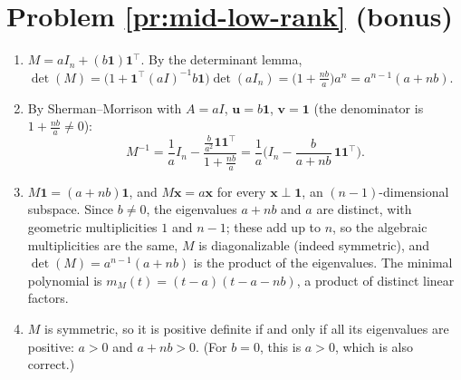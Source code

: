 \documentclass[11pt]{article}
\begin{document}
\section*{Problem \ref{pr:mid-low-rank} (bonus)}

\begin{enumerate}[label=(\alph*)]
    \item $M = aI_n + (b\mathbf{1})\mathbf{1}^\top$. By the determinant lemma, $\det(M) = \big(1 + \mathbf{1}^\top (aI)^{-1} b\mathbf{1}\big)\det(aI_n) = \big(1 + \frac{nb}{a}\big)a^n = a^{n-1}(a + nb)$.
    \item By Sherman--Morrison with $A = aI$, $\mathbf{u} = b\mathbf{1}$, $\mathbf{v} = \mathbf{1}$ (the denominator is $1 + \frac{nb}{a} \neq 0$):
    \[M^{-1} = \frac{1}{a}I_n - \frac{\frac{b}{a^2}\mathbf{1}\mathbf{1}^\top}{1 + \frac{nb}{a}} = \frac{1}{a}\Big(I_n - \frac{b}{a + nb}\,\mathbf{1}\mathbf{1}^\top\Big).\]
    \item $M\mathbf{1} = (a + nb)\mathbf{1}$, and $M\mathbf{x} = a\mathbf{x}$ for every $\mathbf{x} \perp \mathbf{1}$, an $(n - 1)$-dimensional subspace. Since $b \neq 0$, the eigenvalues $a + nb$ and $a$ are distinct, with geometric multiplicities $1$ and $n - 1$; these add up to $n$, so the algebraic multiplicities are the same, $M$ is diagonalizable (indeed symmetric), and $\det(M) = a^{n-1}(a + nb)$ is the product of the eigenvalues. The minimal polynomial is $m_M(t) = (t - a)(t - a - nb)$, a product of distinct linear factors.
    \item $M$ is symmetric, so it is positive definite if and only if all its eigenvalues are positive: $a > 0$ and $a + nb > 0$. (For $b = 0$, this is $a > 0$, which is also correct.)
\end{enumerate}
\end{document}

